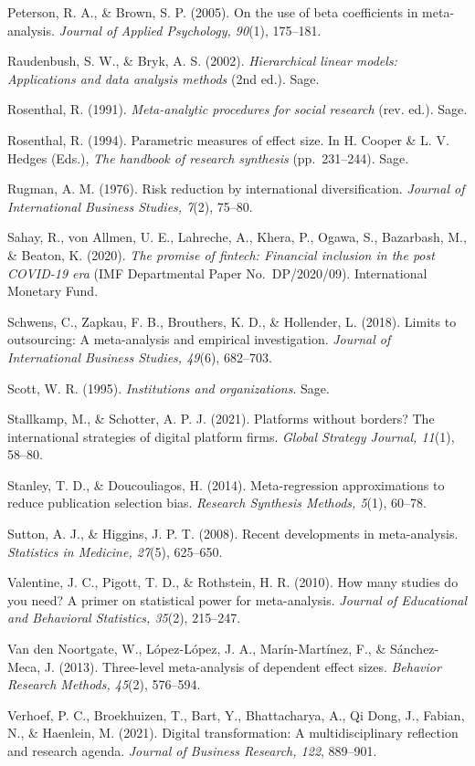 \documentclass[
  12pt,a4paper]{article}
\begin{document}
Peterson, R. A., \& Brown, S. P. (2005). On the use of beta coefficients
in meta-analysis. \emph{Journal of Applied Psychology, 90}(1), 175--181.

Raudenbush, S. W., \& Bryk, A. S. (2002). \emph{Hierarchical linear
models: Applications and data analysis methods} (2nd ed.). Sage.

Rosenthal, R. (1991). \emph{Meta-analytic procedures for social
research} (rev. ed.). Sage.

Rosenthal, R. (1994). Parametric measures of effect size. In H. Cooper
\& L. V. Hedges (Eds.), \emph{The handbook of research synthesis}
(pp.~231--244). Sage.

Rugman, A. M. (1976). Risk reduction by international diversification.
\emph{Journal of International Business Studies, 7}(2), 75--80.

Sahay, R., von Allmen, U. E., Lahreche, A., Khera, P., Ogawa, S.,
Bazarbash, M., \& Beaton, K. (2020). \emph{The promise of fintech:
Financial inclusion in the post COVID-19 era} (IMF Departmental Paper
No.~DP/2020/09). International Monetary Fund.

Schwens, C., Zapkau, F. B., Brouthers, K. D., \& Hollender, L. (2018).
Limits to outsourcing: A meta-analysis and empirical investigation.
\emph{Journal of International Business Studies, 49}(6), 682--703.

Scott, W. R. (1995). \emph{Institutions and organizations}. Sage.

Stallkamp, M., \& Schotter, A. P. J. (2021). Platforms without borders?
The international strategies of digital platform firms. \emph{Global
Strategy Journal, 11}(1), 58--80.

Stanley, T. D., \& Doucouliagos, H. (2014). Meta-regression
approximations to reduce publication selection bias. \emph{Research
Synthesis Methods, 5}(1), 60--78.

Sutton, A. J., \& Higgins, J. P. T. (2008). Recent developments in
meta-analysis. \emph{Statistics in Medicine, 27}(5), 625--650.

Valentine, J. C., Pigott, T. D., \& Rothstein, H. R. (2010). How many
studies do you need? A primer on statistical power for meta-analysis.
\emph{Journal of Educational and Behavioral Statistics, 35}(2),
215--247.

Van den Noortgate, W., López-López, J. A., Marín-Martínez, F., \&
Sánchez-Meca, J. (2013). Three-level meta-analysis of dependent effect
sizes. \emph{Behavior Research Methods, 45}(2), 576--594.

Verhoef, P. C., Broekhuizen, T., Bart, Y., Bhattacharya, A., Qi Dong,
J., Fabian, N., \& Haenlein, M. (2021). Digital transformation: A
multidisciplinary reflection and research agenda. \emph{Journal of
Business Research, 122}, 889--901.
\end{document}
